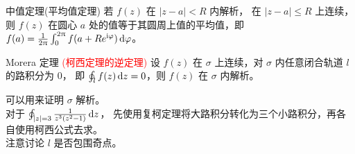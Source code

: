 \documentclass[12pt, a4paper, oneside, UTF8]{ctexbook}
\begin{document}
\begin{corollary}{中值定理(平均值定理)}{}
    若 $f(z)$ 在 $\left\lvert z-a \right\rvert < R$ 内解析，
    在 $\left\lvert z-a \right\rvert \leqslant R$ 上连续，
    则 $f(z)$ 在圆心 $a$ 处的值等于其圆周上值的平均值，即 
    $f(a) = \frac{1}{2\uppi} \int_{0}^{2\uppi} f(a + R e^{\mathrm{i} \varphi}) \mathop{}\!\mathrm{d} \varphi$。
\end{corollary}

\begin{corollary}{Morera 定理 \textcolor{red}{(柯西定理的逆定理)}}{}
    设 $f(z)$ 在 $\sigma$ 上连续，对 $\sigma$ 内任意闭合轨道 $l$ 的路积分为 $0$，
    即 $\oint_{l} f(z) \mathop{}\!\mathrm{d} z = 0$，则 $f(z)$ 在 $\sigma$ 内解析。
\end{corollary}
\noindent {} 可以用来证明 $\sigma$ 解析。\\
 对于 $\oint_{\left\lvert z \right\rvert = 3} \frac{1}{z^3(z^2-1)} \mathop{}\!\mathrm{d} z$，
先使用复柯定理将大路积分转化为三个小路积分，再各自使用柯西公式去求。\\
 注意讨论 $l$ 是否包围奇点。

\ifx\allfiles\undefined
\end{document}
